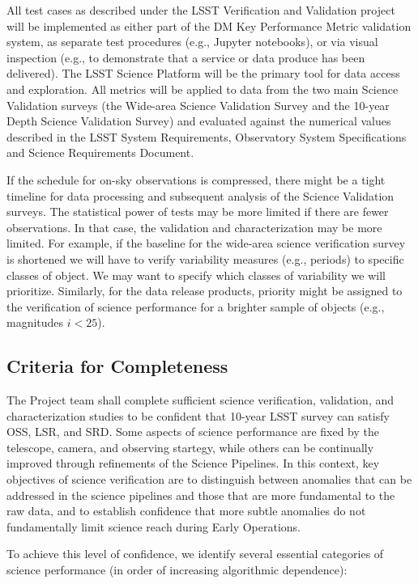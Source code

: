 All test cases as described under the LSST Verification and Validation  project will be implemented as either part of the DM Key Performance Metric validation system, as separate test procedures (e.g., Jupyter notebooks), or via visual inspection (e.g., to demonstrate that a service or data produce has been delivered). The LSST Science Platform will be the primary tool for data access and exploration. All metrics will be applied to data from the two main Science Validation surveys (the Wide-area Science Validation Survey and the 10-year Depth Science Validation Survey) and evaluated against the numerical values described in the LSST System Requirements, Observatory System Specifications and Science Requirements Document.

If the schedule for on-sky observations is compressed, there might be a tight timeline for data processing and subsequent analysis of the Science Validation surveys. The statistical power of tests may be more limited if there are fewer observations. In that case, the validation and characterization may be more limited. For example, if the baseline for the wide-area science verification survey is shortened we will have to verify variability measures (e.g., periods) to specific classes of object. We may want to specify which classes of variability we will prioritize. Similarly, for the data release products, priority might be assigned to the verification of science performance for a brighter sample of objects (e.g., magnitudes $i < 25$).

\subsection{Criteria for Completeness}
The Project team shall complete sufficient science verification, validation, and characterization studies to be confident that 10-year LSST survey can satisfy OSS, LSR, and SRD. Some aspects of science performance are fixed by the telescope, camera, and observing startegy, while others can be continually improved through refinements of the Science Pipelines. In this context, key objectives of science verification are to distinguish between anomalies that can be addressed in the science pipelines and those that are more fundamental to the raw data, and to establish confidence that more subtle anomalies do not fundamentally limit science reach during Early Operations.

To achieve this level of confidence, we identify several essential categories of science performance (in order of increasing algorithmic dependence):

